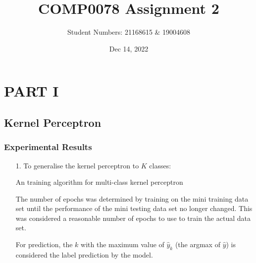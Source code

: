 \documentclass[12pt]{article}
\title{\textbf{COMP0078 Assignment 2}}
\author{Student Numbers: 21168615 \& 19004608 \\ }
\date{Dec 14, 2022}
\begin{document}
    \maketitle
\section{PART I}
\subsection{Kernel Perceptron}
\subsubsection{Experimental Results}

\begin{itemize}
    \item[1.] To generalise the kernel perceptron to $K$ classes:
    \begin{algorithm}
    \caption{An training algorithm for multi-class kernel perceptron}\label{alg:cap}
    \begin{algorithmic}
    $ \Comment Initialise weights for first training example
        \State $w^{1, 1}_k $
    \EndFor

    \For{$i\in\{1, 2, ..., M\}$}: \Comment Number of Epochs
        \For{$j\in\{2, ..., N\}}$ \Comment Number of training points (skipping the first point)
            $ \Comment Number of classes
                \State $_k^{i, j} \gets  \sum_{i'=1}^{i-1} \sum_{j'=1}^{j-1} ( w^{i', j'}_k \cdot  k(\textbf{x}_{j'}, \textbf{x}_j)} )$ \Comment{Prediction for class $k$ with kernel $k(\cdot, \cdot)$}
                \If{$sign(\hat{y}_k^{i, j}) \neq sign(y_k^{i, j})$} \Comment Compare predicted $\hat{y}_k^{i, j}$ and actual $y_k^{i, j})$
                    \State $w^{i, j}_{k} \gets y_k^{i, j}$
                \Else
                    \State $w^{i, j}_{k} \gets 0$
                \EndIf
            \EndFor
        \EndFor
    \EndFor
    \end{algorithmic}
    \end{algorithm}

    The number of epochs was determined by training on the mini training data set until the performance of the mini testing data set no longer changed.
    This was considered a reasonable number of epochs to use to train the actual data set.

    For prediction, the $k$ with the maximum value of $\hat{y}_k$ (the argmax of $\hat{y}$) is considered the label prediction by the model.
    \newpage


\end{itemize}
\end{document}
